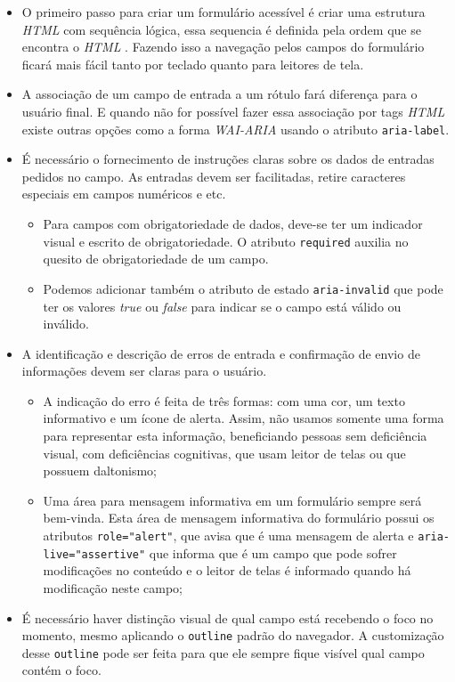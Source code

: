 {\begin{itemize}
    \item O primeiro passo para criar um formulário acessível é criar uma estrutura \textit{HTML} \cite{HTML} com sequência lógica, essa sequencia é definida pela ordem que se encontra o \textit{HTML} \cite{HTML}. Fazendo isso a navegação pelos campos do formulário ficará mais fácil tanto por teclado quanto para leitores de tela. 
    \item A associação de um campo de entrada a um rótulo fará diferença para o usuário final. E quando não for possível fazer essa associação por tags \textit{HTML} \cite{HTML} existe outras opções como a forma \textit{WAI-ARIA} \cite{WAI-ARIA} usando o atributo \lstinline{aria-label}.
    \item É necessário o fornecimento de instruções claras sobre os dados de entradas pedidos no campo. As entradas devem ser facilitadas, retire caracteres especiais em campos numéricos e etc. 
    \begin{itemize}
        \item Para campos com obrigatoriedade de dados, deve-se ter um indicador visual e escrito de obrigatoriedade. O atributo \lstinline{required} auxilia no quesito de obrigatoriedade de um campo.
        \item Podemos adicionar também o atributo de estado \lstinline{aria-invalid} que pode ter os valores \textit{true} ou \textit{false} para indicar se o campo está válido ou inválido.
    \end{itemize}
    \item A identificação e descrição de erros de entrada e confirmação de envio de informações devem ser claras para o usuário. 
    \begin{itemize}
        \item A indicação do erro é feita de três formas: com uma cor, um texto informativo e um ícone de alerta. Assim, não usamos somente uma forma para representar esta informação, beneficiando pessoas sem deficiência visual, com deficiências cognitivas, que usam leitor de telas ou que possuem daltonismo;
        \item Uma área para mensagem informativa em um formulário sempre será bem-vinda. Esta área de mensagem informativa do formulário possui os atributos \lstinline{role="alert"}, que avisa que é uma mensagem de alerta e \lstinline{aria-live="assertive"} que informa que é um campo que pode sofrer modificações no conteúdo e o leitor de telas é informado quando há modificação neste campo;
    \end{itemize}
    \item É necessário haver distinção visual de qual campo está recebendo o foco no momento, mesmo aplicando o \lstinline{outline} padrão do navegador. A customização desse \lstinline{outline} pode ser feita para que ele sempre fique visível qual campo contém o foco.
    

\end{itemize}}
